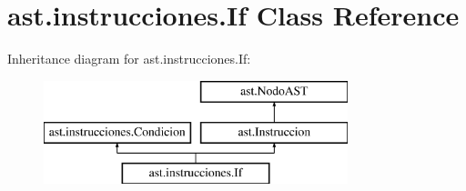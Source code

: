 \hypertarget{classast_1_1instrucciones_1_1_if}{}\section{ast.\+instrucciones.\+If Class Reference}
\label{classast_1_1instrucciones_1_1_if}
Inheritance diagram for ast.\+instrucciones.\+If\+:\begin{figure}[H]
\begin{center}
\leavevmode
\includegraphics[height=3.000000cm]{classast_1_1instrucciones_1_1_if}
\end{center}
\end{figure}
